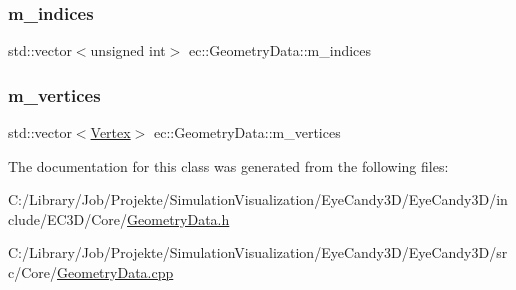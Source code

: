 \subsubsection{\texorpdfstring{m\+\_\+indices}{m\_indices}}
{\footnotesize\ttfamily std\+::vector$<$unsigned int$>$ ec\+::\+Geometry\+Data\+::m\+\_\+indices}

\mbox{\label{classec_1_1_geometry_data_ade3f4dd48315b696846bb2c00267394c}} 
\subsubsection{\texorpdfstring{m\+\_\+vertices}{m\_vertices}}
{\footnotesize\ttfamily std\+::vector$<$\mbox{\hyperlink{structec_1_1_vertex}{Vertex}}$>$ ec\+::\+Geometry\+Data\+::m\+\_\+vertices}



The documentation for this class was generated from the following files\+:\begin{DoxyCompactItemize}
\item 
C\+:/\+Library/\+Job/\+Projekte/\+Simulation\+Visualization/\+Eye\+Candy3\+D/\+Eye\+Candy3\+D/include/\+E\+C3\+D/\+Core/\mbox{\hyperlink{_geometry_data_8h}{Geometry\+Data.\+h}}\item 
C\+:/\+Library/\+Job/\+Projekte/\+Simulation\+Visualization/\+Eye\+Candy3\+D/\+Eye\+Candy3\+D/src/\+Core/\mbox{\hyperlink{_geometry_data_8cpp}{Geometry\+Data.\+cpp}}\end{DoxyCompactItemize}
